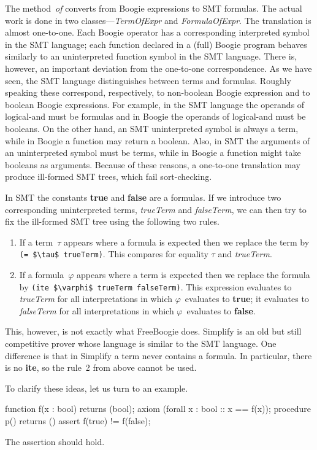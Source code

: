 \documentclass[a4paper]{article}
\newcommand{\smtCode}{\lstinline[style=smt,basicstyle=\normalsize]}
\theoremstyle{slanted}
\theoremstyle{definition}
\theoremstyle{remark}
\begin{document}
The method~\textit{of} converts from Boogie expressions
to SMT formulas. The actual work is done in two
classes---\textit{TermOfExpr} and \textit{FormulaOfExpr}. The
translation is almost one-to-one. Each Boogie operator has a
corresponding interpreted symbol in the SMT language; each
function declared in a (full) Boogie program behaves similarly
to an uninterpreted function symbol in the SMT language.
There is, however, an important deviation from the one-to-one
correspondence. As we have seen, the SMT language distinguishes
between terms and formulas. Roughly speaking these correspond,
respectively, to non-boolean Boogie expression and to boolean
Boogie expressions. For example, in the SMT language the
operands of logical-and must be formulas and in Boogie the
operands of logical-and must be booleans. On the other hand, an
SMT uninterpreted symbol is always a term, while in Boogie a
function may return a boolean. Also, in SMT the arguments of an
uninterpreted symbol must be terms, while in Boogie a function
might take booleans as arguments. Because of these reasons, a
one-to-one translation may produce ill-formed SMT trees, which
fail sort-checking.

In SMT the constants \textbf{true} and \textbf{false} are a
formulas. If we introduce two corresponding uninterpreted terms,
\textit{trueTerm} and \textit{falseTerm}, we can then try to fix
the ill-formed SMT tree using the following two rules.
\begin{enumerate}
\item If a term~$\tau$ appears where a formula is expected then we 
  replace the term by \smtCode|(= $\tau$ trueTerm)|. This compares
  for equality $\tau$ and \textit{trueTerm}.
\item If a formula~$\varphi$ appears where a term is expected
  then we replace the formula by 
  \smtCode|(ite $\varphi$ trueTerm falseTerm)|.
  This expression evaluates to \textit{trueTerm} for all 
  interpretations in which $\varphi$~evaluates to \textbf{true};
  it evaluates to \textit{falseTerm} for all interpretations
  in which $\varphi$~evaluates to \textbf{false}.
\end{enumerate}
This, however, is not exactly what FreeBoogie does.
Simplify is an old but still competitive prover whose language is
similar to the SMT language. One difference is that in Simplify
a term never contains a formula. In particular, there is no
\textbf{ite}, so the rule~2 from above cannot be used.

To clarify these ideas, let us turn to an example.
\begin{boogie}
function f(x : bool) returns (bool);
axiom (forall x : bool :: x == f(x));
procedure p() returns () { assert f(true) != f(false); }
\end{boogie}
The assertion should hold. 
\end{document}
